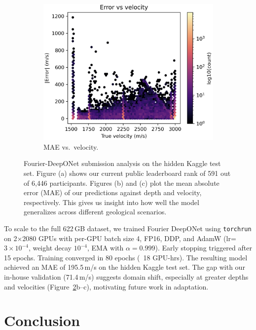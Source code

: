 \documentclass{article}
\newcommand{\instructions}[1]{{\color{blue} #1}}
\begin{document}
\begin{figure}[t]
\begin{subfigure}[b]{0.32\linewidth}
        \centering
        \includegraphics[width=\linewidth]{figures/fdonet_error_velocity.png}
        \caption{MAE vs.\ velocity.}
        \label{fig:fdonet_vel}
    \end{subfigure}
    \vspace{-4pt}
    \caption{Fourier-DeepONet submission analysis on the hidden Kaggle test set. Figure (a) shows our current public leaderboard rank of 591 out of 6,446 participants. Figures (b) and (c) plot the mean absolute error (MAE) of our predictions against depth and velocity, respectively. This gives us insight into how well the model generalizes across different geological scenarios.}
    \label{fig:kaggle_triptych}
\end{figure}

To scale to the full 622\,GB dataset, we trained Fourier DeepONet using \texttt{torchrun} on 2×2080 GPUs with per-GPU batch size 4, FP16, DDP, and AdamW (lr=$3\times10^{-4}$, weight decay $10^{-4}$, EMA with $\alpha{=}0.999$). Early stopping triggered after 15 epochs. Training converged in 80 epochs (~18 GPU-hrs). The resulting model achieved an MAE of 195.5\,m/s on the hidden Kaggle test set. The gap with our in-house validation (71.4\,m/s) suggests domain shift, especially at greater depths and velocities (Figure~\ref{fig:kaggle_triptych}b–c), motivating future work in adaptation.

\section{Conclusion}
\end{document}
